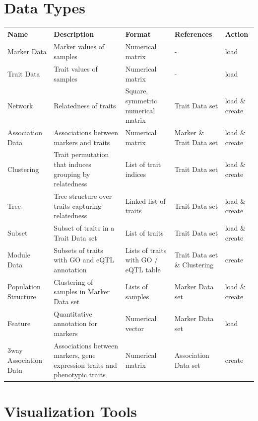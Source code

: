 \documentclass{article}
\begin{document}
\begin{appendices}
\section{Data Types} \label{types}

\begin{longtable}{p{2cm}p{4cm}p{4cm}p{2cm}p{2cm}}
\hline Name&Description&Format&References&Action \\  \hline

\endhead

Marker Data & Marker values of samples & Numerical matrix & - & load \\ \hline
Trait Data & Trait values of samples & Numerical matrix & - & load \\ \hline
Network & Relatedness of traits & Square, symmetric numerical matrix & Trait Data set & load \& create \\ \hline
Association Data & Associations between markers and traits & Numerical matrix & Marker \& Trait Data set & load \& create \\ \hline
Clustering & Trait permutation that induces grouping by relatedness & List of trait indices & Trait Data set & load \& create \\ \hline
Tree & Tree structure over traits capturing relatedness & Linked list of traits & Trait Data set & load \& create \\ \hline
Subset & Subset of traits in a Trait Data set & List of traits & Trait Data set & load \& create \\ \hline
Module Data & Subsets of traits with GO and eQTL annotation & Lists of traits with GO / eQTL table & Trait Data set \& Clustering & create \\ \hline
Population Structure & Clustering of samples in Marker Data set & Lists of samples & Marker Data set & load \& create \\ \hline
Feature & Quantitative annotation for markers & Numerical vector & Marker Data set & load \\ \hline
3way Association Data & Associations between markers, gene expression traits and phenotypic traits & Numerical matrix & Association Data set & create \\ \hline

\end{longtable}


\section{Visualization Tools} \label{visTools}


\end{appendices}
\end{document}
